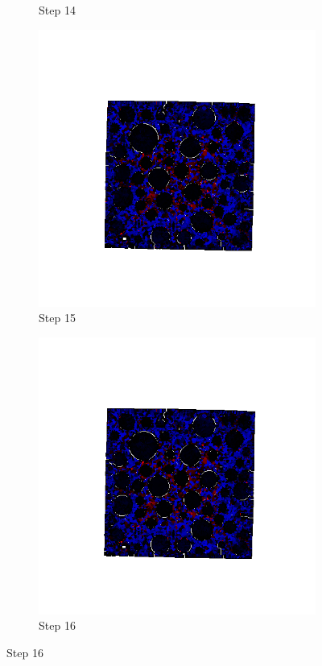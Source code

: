 \begin{figure}[ht!]
\begin{subfigure}{.25\textwidth}
      \caption{Step 14}
      \end{subfigure}%
      \begin{subfigure}{.25\textwidth}
        \centering
        \includegraphics[width=1.0\linewidth]{Files/A30X0C_3_IS/DEP50-STEP(015).png}
      \caption{Step 15}
      \end{subfigure}%
      \begin{subfigure}{.25\textwidth}
        \centering
        \includegraphics[width=1.0\linewidth]{Files/A30X0C_3_IS/DEP50-STEP(016).png}
      \caption{Step 16}
      \end{subfigure}


\end{figure}
